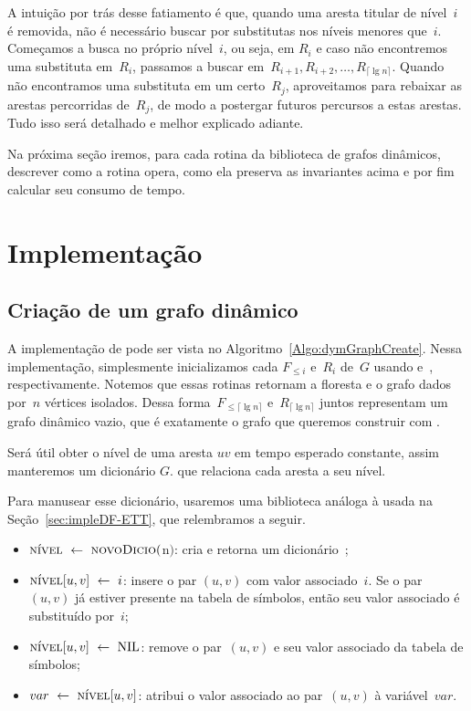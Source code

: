 A intuição por trás desse fatiamento é que, quando uma aresta titular de nível~$i$ é removida, não é necessário buscar por substitutas nos níveis menores que~$i$.
Começamos a busca no próprio nível~$i$, ou seja, em $R_i$ e caso não encontremos uma substituta em~$R_i$, passamos a buscar em~$R_{i+1}, R_{i+2}, \ldots, R_{\lceil \lg n \rceil}$.
Quando não encontramos uma substituta em um certo~$R_j$, aproveitamos para rebaixar as arestas percorridas de~$R_j$, de modo a postergar futuros percursos a estas arestas.
Tudo isso será detalhado e melhor explicado adiante.

Na próxima seção iremos, para cada rotina da biblioteca de grafos dinâmicos, descrever como a rotina opera, como ela preserva as invariantes acima e por fim calcular seu consumo de tempo.

\section{Implementação}
\subsection{Criação de um grafo dinâmico}

A implementação de \dymGraphCreate{} pode ser vista no Algoritmo~\ref{Algo:dymGraphCreate}. Nessa implementação, simplesmente inicializamos cada $F_{\leqslant i}$ e~$R_i$ de~$G$ usando \dymForestCreate{} e~\graphCreate{}, respectivamente. Notemos que essas rotinas retornam a floresta e o grafo dados por~$n$ vértices isolados. Dessa forma~$F_{\leqslant \lceil \lg n \rceil}$ e~$R_{\lceil \lg n \rceil}$ juntos representam um grafo dinâmico vazio, que é exatamente o grafo que queremos construir com \dymGraphCreate{}.

Será útil obter o nível de uma aresta $uv$ em tempo esperado constante, assim manteremos um dicionário $G$.\nivel{} que relaciona cada aresta a seu nível.

\newpage
Para manusear esse dicionário, usaremos uma biblioteca análoga à usada na Seção~\ref{sec:impleDF-ETT}, que relembramos a seguir.

\begin{itemize}
    \item $\nivel~\gets~\hashCreate($n$)$: cria e retorna um dicionário~\nivel{};
    \item $\nivel[u,v]~\gets~i$: insere o par $(u,v)$ com valor associado~$i$. Se o par~$(u,v)$ já estiver presente na tabela de símbolos, então seu valor associado é substituído por~$i$;
    \item $\nivel[u,v]~\gets~\Nil$: remove o par~$(u,v)$ e seu valor associado da tabela de símbolos;
    \item $var~\gets~\nivel[u,v]$: atribui o valor associado ao par~$(u,v)$ à variável~$var$.
\end{itemize}

